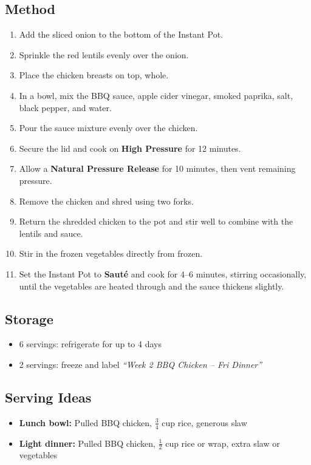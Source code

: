 \documentclass[11pt,a4paper]{article}
\begin{document}
\subsection*{Method}
\begin{enumerate}
    \item Add the sliced onion to the bottom of the Instant Pot.
    \item Sprinkle the red lentils evenly over the onion.
    \item Place the chicken breasts on top, whole.
    \item In a bowl, mix the BBQ sauce, apple cider vinegar, smoked paprika, salt, black pepper, and water.
    \item Pour the sauce mixture evenly over the chicken.
    \item Secure the lid and cook on \textbf{High Pressure} for 12 minutes.
    \item Allow a \textbf{Natural Pressure Release} for 10 minutes, then vent remaining pressure.
    \item Remove the chicken and shred using two forks.
    \item Return the shredded chicken to the pot and stir well to combine with the lentils and sauce.
    \item Stir in the frozen vegetables directly from frozen.
    \item Set the Instant Pot to \textbf{Sauté} and cook for 4--6 minutes, stirring occasionally, until the vegetables are heated through and the sauce thickens slightly.
\end{enumerate}

\vspace{0.5em}

\subsection*{Storage}
\begin{itemize}
    \item 6 servings: refrigerate for up to 4 days
    \item 2 servings: freeze and label \emph{``Week 2 BBQ Chicken -- Fri Dinner''}
\end{itemize}

\vspace{0.5em}

\subsection*{Serving Ideas}
\begin{itemize}
    \item \textbf{Lunch bowl:} Pulled BBQ chicken, $\tfrac{3}{4}$ cup rice, generous slaw
    \item \textbf{Light dinner:} Pulled BBQ chicken, $\tfrac{1}{2}$ cup rice or wrap, extra slaw or vegetables
\end{itemize}
\end{document}
